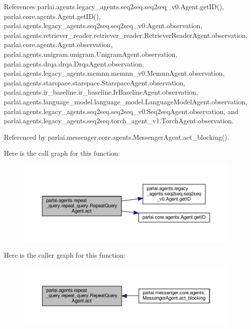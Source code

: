References parlai.\+agents.\+legacy\+\_\+agents.\+seq2seq.\+seq2seq\+\_\+v0.\+Agent.\+get\+I\+D(), parlai.\+core.\+agents.\+Agent.\+get\+I\+D(), parlai.\+agents.\+legacy\+\_\+agents.\+seq2seq.\+seq2seq\+\_\+v0.\+Agent.\+observation, parlai.\+agents.\+retriever\+\_\+reader.\+retriever\+\_\+reader.\+Retriever\+Reader\+Agent.\+observation, parlai.\+core.\+agents.\+Agent.\+observation, parlai.\+agents.\+unigram.\+unigram.\+Unigram\+Agent.\+observation, parlai.\+agents.\+drqa.\+drqa.\+Drqa\+Agent.\+observation, parlai.\+agents.\+legacy\+\_\+agents.\+memnn.\+memnn\+\_\+v0.\+Memnn\+Agent.\+observation, parlai.\+agents.\+starspace.\+starspace.\+Starspace\+Agent.\+observation, parlai.\+agents.\+ir\+\_\+baseline.\+ir\+\_\+baseline.\+Ir\+Baseline\+Agent.\+observation, parlai.\+agents.\+language\+\_\+model.\+language\+\_\+model.\+Language\+Model\+Agent.\+observation, parlai.\+agents.\+legacy\+\_\+agents.\+seq2seq.\+seq2seq\+\_\+v0.\+Seq2seq\+Agent.\+observation, and parlai.\+agents.\+legacy\+\_\+agents.\+seq2seq.\+torch\+\_\+agent\+\_\+v1.\+Torch\+Agent.\+observation.



Referenced by parlai.\+messenger.\+core.\+agents.\+Messenger\+Agent.\+act\+\_\+blocking().

Here is the call graph for this function\+:
\nopagebreak
\begin{figure}[H]
\begin{center}
\leavevmode
\includegraphics[width=350pt]{classparlai_1_1agents_1_1repeat__query_1_1repeat__query_1_1RepeatQueryAgent_a7db5db4eda3e033a9022a4f4fe74419b_cgraph}
\end{center}
\end{figure}
Here is the caller graph for this function\+:
\nopagebreak
\begin{figure}[H]
\begin{center}
\leavevmode
\includegraphics[width=350pt]{classparlai_1_1agents_1_1repeat__query_1_1repeat__query_1_1RepeatQueryAgent_a7db5db4eda3e033a9022a4f4fe74419b_icgraph}
\end{center}
\end{figure}



